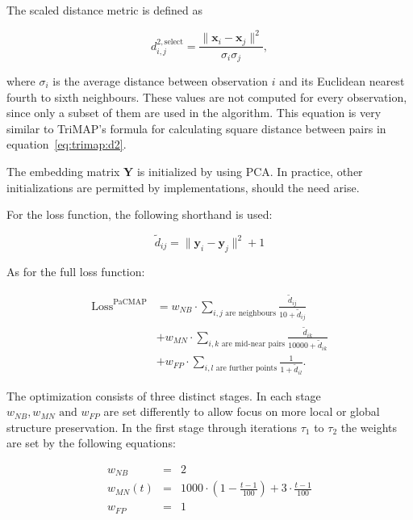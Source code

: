 The scaled distance metric is defined as

\begin{equation}
	\label{eq:pacmap:dselect}
	d^{2,\textrm{select}}_{i,j}=\frac{\|\mathbf{x}_{i}-\mathbf{x}_{j}\|^2}{\sigma_i \sigma_j},
\end{equation}

where $\sigma_i$ is the average distance between observation $i$ and its Euclidean nearest fourth to sixth neighbours. These values are not computed for every observation, since only a subset of them are used in the algorithm. This equation is very similar to TriMAP's formula for calculating square distance between pairs in equation~\eqref{eq:trimap:d2}.

The embedding matrix $\mathbf{Y}$ is initialized by using PCA. In practice, other initializations are permitted by implementations, should the need arise.

For the loss function, the following shorthand is used:

\begin{equation}
	\tilde{d}_{ij} = \|\mathbf{y}_i-\mathbf{y}_j\|^2+1
\end{equation}

As for the full loss function:

\begin{equation}
	\begin{aligned}
		\textrm{Loss}^{\textrm{PaCMAP}} &=
		w_{NB}\cdot\sum_{i,j \text{ are neighbours}}\frac{\tilde{d}_{ij}}{10 + \tilde{d}_{ij}} \\ 
		& + w_{MN}\cdot\sum_{i,k \text{ are mid-near pairs}}\frac{\tilde{d}_{ik}}{10000 + \tilde{d}_{ik}} \\
		& + w_{FP}\cdot\sum_{i,l \text{ are further points}}\frac{1}{1 + \tilde{d}_{il}}.    
	\end{aligned}
\end{equation}

The optimization consists of three distinct stages. In each stage $w_{NB}, w_{MN} \textrm{ and } w_{FP}$ are set differently to allow focus on more local or global structure preservation. In the first stage through iterations $\tau_1$ to $\tau_2$ the weights are set by the following equations:

\begin{equation}
	\begin{aligned}
		w_{NB} & = & 2 \\
		w_{MN}(t) & = & 1000\cdot\left( 1-\frac{t-1}{100} \right) + 3\cdot \frac{t-1}{100} \\
		w_{FP} & = & 1
	\end{aligned}
\end{equation}

